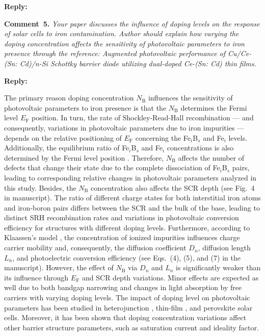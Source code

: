 \documentclass[a4paper,fleqn]{cas-sc}
\begin{document}
\noindent
\textcolor[rgb]{0.51,0.00,0.00}{\textbf{Reply:}}




\vspace{1cm}
\noindent
\textcolor[rgb]{0.00,0.50,1.00}{\textbf{Comment~5.}}
\emph{Your paper discusses the influence of doping levels on the response of solar cells to iron contamination.
Author should explain how varying the doping concentration affects the sensitivity of photovoltaic parameters to iron presence through the reference:
Augmented photovoltaic performance of Cu/Ce-(Sn: Cd)/n-Si Schottky barrier diode utilizing dual-doped Ce-(Sn: Cd) thin films.}

\noindent
\textcolor[rgb]{0.51,0.00,0.00}{\textbf{Reply:}}


The primary reason doping concentration $N_\mathrm{B}$ influences the sensitivity of photovoltaic
parameters to iron presence is that the $N_\mathrm{B}$ determines the Fermi level $E_\mathrm{F}$ position.
In turn, the rate of Shockley-Read-Hall recombination ---
and consequently, variations in photovoltaic parameters due to iron impurities ---
depends on the relative positioning of $E_\mathrm{F}$ concerning the Fe$_i$B$_s$ and Fe$_i$ levels.
Additionally, the equilibrium ratio of Fe$_i$B$_s$ and Fe$_i$ concentrations is also determined by the Fermi level position \cite{FeB:kinetic,MurphyJAP2011}.
Therefore, $N_\mathrm{B}$ affects the number of defects that change their state due to the complete dissociation of Fe$_i$B$_s$ pairs,
leading to corresponding relative changes in photovoltaic parameters analyzed in this study.
Besides, the $N_\mathrm{B}$ concentration also affects the SCR depth (see Fig.~4 in manuscript).
The ratio of different charge states for both interstitial iron atoms and iron-boron pairs differs between the SCR and the bulk of the base, leading to distinct SRH recombination rates and variations in photovoltaic conversion efficiency for structures with different doping levels.
Furthermore, according to Klaassen’s model \cite{KLAASSEN953},
the concentration of ionized impurities influences charge carrier mobility and, consequently, the diffusion coefficient $D_n$, diffusion length $L_n$,
and photoelectric conversion efficiency (see Eqs.~(4), (5), and (7) in the manuscript).
However, the effect of $N_\mathrm{B}$ via $D_n$ and $L_n$ is significantly weaker than its influence through $E_\mathrm{F}$ and SCR depth variations.
Minor effects are expected as well due to both bandgap narrowing and changes in light absorption by free carriers with varying doping levels.
The impact of doping level on photovoltaic parameters has been studied in heterojunction \cite{Sultana2024},
thin-film \cite{Akila2024},
and perovskite \cite{MasumMia2025} solar cells.
Moreover, it has been shown \cite{Akila2024} that
doping concentration variations affect other barrier structure parameters, such as saturation current and ideality factor.
\end{document}
